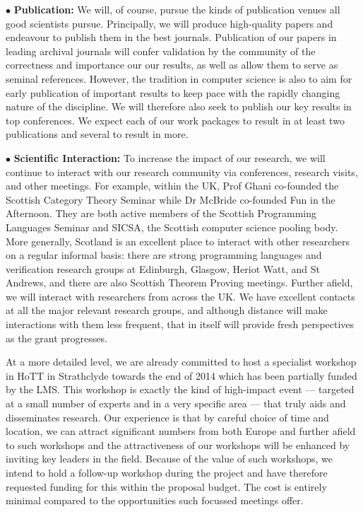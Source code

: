 \documentclass[a4paper,11pt]{article}
\begin{document}
\vspace*{0.02in}

$\bullet$ {\bf Publication:} We will, of course, pursue the kinds of
publication venues all good scientists pursue. Principally, we will
produce high-quality papers and endeavour to publish them in the best
journals. Publication of our papers in leading archival journals will
confer validation by the community of the correctness and importance
our our results, as well as allow them to serve as seminal references.
However, the tradition in computer science is also to aim for early
publication of important results to keep pace with the rapidly
changing nature of the discipline. We will therefore also seek to
publish our key results in top conferences. We expect each of our work
packages to result in at least two publications and several to result
in more.

\vspace*{0.02in} $\bullet$ {\bf Scientific
  Interaction:} %
To increase the impact of our research, we will continue to interact
with our research community via %
conferences, research visits, and other meetings. For example, within the UK, Prof
Ghani co-founded the Scottish Category Theory Seminar while Dr McBride
co-founded Fun in the Afternoon. They are both active members of the
Scottish Programming Languages Seminar and SICSA, the Scottish computer science pooling
body. More generally, Scotland is an excellent place to interact with
other researchers on a regular informal basis: there
are %
strong programming languages and verification research groups at Edinburgh, Glasgow,
Heriot Watt, and St Andrews, and there are also Scottish Theorem
Proving meetings. Further afield, we will interact with researchers
from across the UK. We have excellent contacts at all the major
relevant research groups, and although distance will make interactions
with them less frequent, that in itself will provide fresh
perspectives as the grant progresses. 

At a more detailed level, we are already committed to host a
specialist workshop in HoTT in Strathclyde towards the end of 2014
which has been partially funded by the LMS. This workshop is exactly
the kind of high-impact event --- targeted at a small number of
experts and in a very specific area --- that truly aids and
disseminates research. Our experience is that by careful choice of
time and location, we can attract significant numbers from both Europe
and further afield to such workshops and the attractiveness of our
workshops will be enhanced by inviting key leaders in the
field. Because of the value of such workshops, we intend to hold a
follow-up workshop during the project and have therefore requested
funding for this within the proposal budget.  The cost is entirely
minimal compared to the opportunities such focussed meetings offer.
\end{document}
